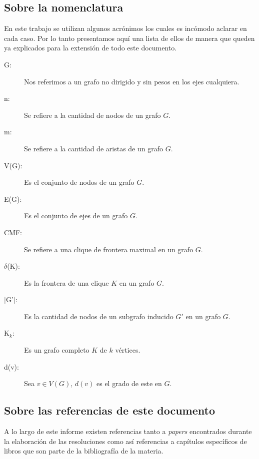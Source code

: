 {}
\subsection*{Sobre la nomenclatura}
\par En este trabajo se utilizan algunos acr\'onimos los cuales es inc\'omodo
    aclarar en cada caso. Por lo tanto presentamos aqu\'i una lista de ellos
    de manera que queden ya explicados para la extensi\'on de todo este
    documento.

\begin{description}
    \item[G: ] Nos referimos a un grafo no dirigido y sin pesos en los ejes
        cualquiera.

    \item[n: ] Se refiere a la cantidad de nodos de un grafo $G$.

    \item[m: ] Se refiere a la cantidad de aristas de un grafo $G$.

    \item[V(G): ] Es el conjunto de nodos de un grafo $G$.

    \item[E(G): ] Es el conjunto de ejes de un grafo $G$.

    \item[CMF: ] Se refiere a una clique de frontera maximal en un grafo $G$.

    \item[$\delta$(K): ] Es la frontera de una clique $K$ en un grafo $G$.

    \item[$|$G'$|$: ] Es la cantidad de nodos de un subgrafo inducido $G'$ en un grafo $G$.

    \item[K$_k$: ] Es un grafo completo $K$ de $k$ v\'ertices.

    \item[d(v): ] Sea $v \in V(G)$, $d(v)$ es el grado de este en $G$.
\end{description}

{}
\subsection*{Sobre las referencias de este documento}
\par A lo largo de este informe existen referencias tanto a \emph{papers}
    encontrados durante la elaboraci\'on de las resoluciones como as\'i
    referencias a cap\'itulos espec\'ificos de libros que son parte de la
    bibliograf\'ia de la materia.


